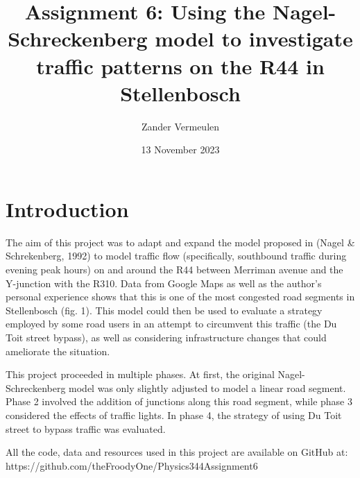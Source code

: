 \documentclass{article}
\title{Assignment 6: Using the Nagel-Schreckenberg model to investigate traffic patterns on the R44 in Stellenbosch}
\author{Zander Vermeulen}
\date{13 November 2023}
\begin{document}
\maketitle

\section*{Introduction}

The aim of this project was to adapt and expand the model proposed in (Nagel \& Schrekenberg, 1992) to model traffic flow (specifically, southbound traffic during evening peak hours) on and around the R44 between Merriman avenue and the Y-junction with the R310. Data from Google Maps as well as the author's personal experience shows that this is one of the most congested road segments in Stellenbosch (fig. 1). This model could then be used to evaluate a strategy employed by some road users in an attempt to circumvent this traffic (the Du Toit street bypass), as well as considering infrastructure changes that could ameliorate the situation.

This project proceeded in multiple phases. At first, the original Nagel-Schreckenberg model was only slightly adjusted to model a linear road segment. Phase 2 involved the addition of junctions along this road segment, while phase 3 considered the effects of traffic lights. In phase 4, the strategy of using Du Toit street to bypass traffic was evaluated.

All the code, data and resources used in this project are available on GitHub at: https://github.com/theFroodyOne/Physics344Assignment6
\end{document}
